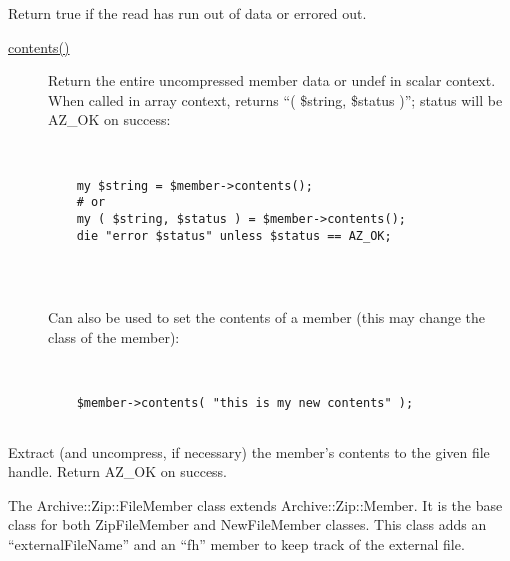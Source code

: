 \documentclass[]{article}
\renewcommand{\emph}[1]{\underline{#1}}
\begin{document}
\begin{description}
\itemsep1pt\parskip0pt
\item[\emph{readIsDone()}]
Return true if the read has run out of data or errored out.
\end{description}

\begin{description}
\item[\emph{contents()}]
Return the entire uncompressed member data or undef in scalar context.
When called in array context, returns ``( \$string, \$status )''; status
will be AZ\_OK on success:

~

\begin{verbatim}
    my $string = $member->contents();
    # or
    my ( $string, $status ) = $member->contents();
    die "error $status" unless $status == AZ_OK;
    
\end{verbatim}

~

Can also be used to set the contents of a member (this may change the
class of the member):

~

\begin{verbatim}
    $member->contents( "this is my new contents" );
    
\end{verbatim}
\end{description}

\begin{description}
\itemsep1pt\parskip0pt
\item[extractToFileHandle( \$fh )]
Extract (and uncompress, if necessary) the member's contents to the
given file handle. Return AZ\_OK on success.
\end{description}


The Archive::Zip::FileMember class extends Archive::Zip::Member. It is
the base class for both ZipFileMember and NewFileMember classes. This
class adds an ``externalFileName'' and an ``fh'' member to keep track of
the external file.
\end{document}
